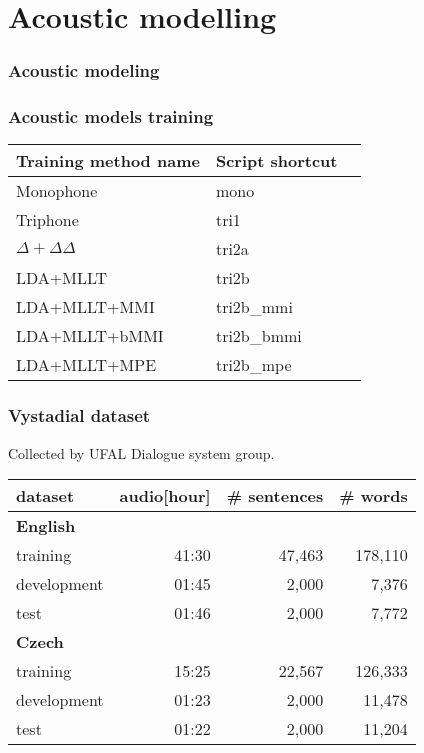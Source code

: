 \section{Acoustic modelling} %

\begin{frame}\frametitle{Acoustic modeling} 
    
\end{frame}

\begin{frame}\frametitle{Acoustic models training} 
    \begin{center}
        
        \small{\begin{tabular}{lll}
        \hline
        Training method name & Script shortcut \\
        \hline
        Monophone & mono \\
        Triphone  & tri1 \\
        $\Delta + \Delta\Delta$ & tri2a  \\
        LDA+MLLT & tri2b  \\
        LDA+MLLT+MMI & tri2b\_mmi \\
        LDA+MLLT+bMMI & tri2b\_bmmi \\
        LDA+MLLT+MPE & tri2b\_mpe \\
        \hline
        \end{tabular}}
    \end{center}
\end{frame}

\begin{frame}\frametitle{Vystadial dataset} 
    \begin{center}
    Collected by UFAL Dialogue system group.\\
    \begin{tabular}{lrrr}
        \hline
        dataset & audio[hour] & \# sentences & \# words \\
        \hline
        \textbf{English} & & & \\
                training & 41:30 & 47,463 & 178,110 \\
                development & 01:45 & 2,000 & 7,376 \\
                test & 01:46 & 2,000 & 7,772 \\
        \hline
        \textbf{Czech} & & & \\
                training & 15:25 & 22,567 & 126,333 \\
                development & 01:23 & 2,000 & 11,478 \\
                test & 01:22 & 2,000 & 11,204 \\
        \hline
		\end{tabular}
    \end{center}
\end{frame}

